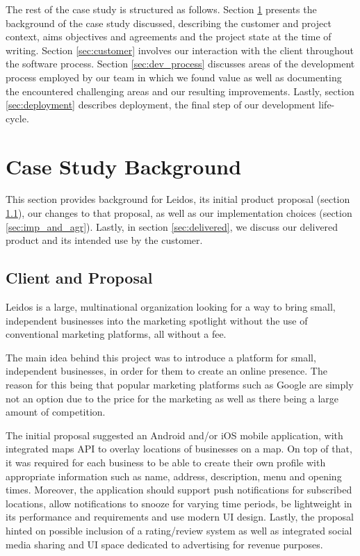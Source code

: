 \documentclass{l3proj}
\begin{document}
The rest of the case study is structured as follows.  Section
\ref{sec:background} presents the background of the case study
discussed, describing the customer and project context, aims
objectives and agreements and the project state at the time of writing.
Section \ref{sec:customer} involves our interaction with the client throughout the software process.
Section \ref{sec:dev_process} discusses areas of the development process employed by our team in which we found value as well as documenting the encountered challenging areas and our resulting improvements. Lastly, section \ref{sec:deployment} describes deployment, the final step of our development life-cycle. 

\section{Case Study Background}
\label{sec:background}
    This section provides background for Leidos, its initial product proposal (section \ref{sec:proposal}), our changes to that proposal, as well as our implementation choices (section \ref{sec:imp_and_agr}). Lastly, in section \ref{sec:delivered}, we discuss our delivered product and its intended use by the customer.
    
    \subsection{Client and Proposal}
    \label{sec:proposal}
        Leidos is a large, multinational organization looking for a way to bring small, independent businesses into the marketing spotlight without the use of conventional marketing platforms, all without a fee.
        

        The main idea behind this project was to introduce a platform for small, independent businesses, in order for them to create an online presence. The reason for this being that popular marketing platforms such as Google are simply not an option due to the price for the marketing as well as there being a large amount of competition.

        

        The initial proposal suggested an Android and/or iOS mobile application, with integrated maps API to overlay locations of businesses on a map. On top of that, it was required for each business to be able to create their own profile with appropriate information such as name, address, description, menu and opening times. Moreover, the application should support push notifications for subscribed locations, allow notifications to snooze for varying time periods, be lightweight in its performance and requirements and use modern UI design.
        Lastly, the proposal hinted on possible inclusion of a rating/review system as well as integrated social media sharing and UI space dedicated to advertising for revenue purposes.
\end{document}
